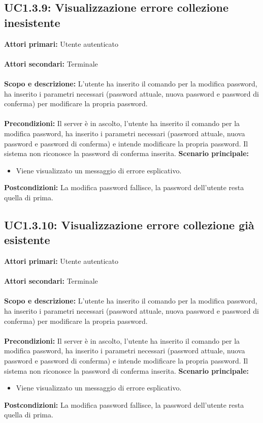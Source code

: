 \documentclass{scalatekids-article}
\begin{document}
\subsection{UC1.3.9: Visualizzazione errore collezione inesistente}

\textbf{Attori primari:} Utente autenticato\\ \\
\textbf{Attori secondari:} Terminale\\ \\
\textbf{Scopo e descrizione:}
L'utente ha inserito il comando per la modifica password, ha inserito i parametri necessari (password attuale, nuova password e password di conferma) per modificare la propria password.\\ \\
\textbf{Precondizioni:} Il server è in ascolto, l'utente ha inserito il comando per la modifica password, ha inserito i parametri necessari (password attuale, nuova password e password di conferma) e intende modificare la propria password. Il sistema non riconosce la password di conferma inserita.
\textbf{Scenario principale:}
\begin{itemize}
  \item Viene visualizzato un messaggio di errore esplicativo.
\end{itemize}
\textbf{Postcondizioni:} La modifica password fallisce, la password dell'utente resta quella di prima.

\subsection{UC1.3.10: Visualizzazione errore collezione già esistente}

\textbf{Attori primari:} Utente autenticato\\ \\
\textbf{Attori secondari:} Terminale\\ \\
\textbf{Scopo e descrizione:}
L'utente ha inserito il comando per la modifica password, ha inserito i parametri necessari (password attuale, nuova password e password di conferma) per modificare la propria password.\\ \\
\textbf{Precondizioni:} Il server è in ascolto, l'utente ha inserito il comando per la modifica password, ha inserito i parametri necessari (password attuale, nuova password e password di conferma) e intende modificare la propria password. Il sistema non riconosce la password di conferma inserita.
\textbf{Scenario principale:}
\begin{itemize}
  \item Viene visualizzato un messaggio di errore esplicativo.
\end{itemize}
\textbf{Postcondizioni:} La modifica password fallisce, la password dell'utente resta quella di prima.
\end{document}
